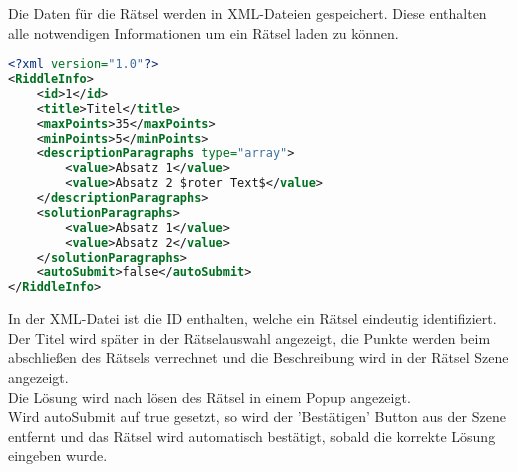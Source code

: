 Die Daten für die Rätsel werden in XML-Dateien gespeichert. Diese enthalten alle notwendigen Informationen um ein Rätsel laden zu können.
\begin{lstlisting}[language=xml, caption={Aufbau einer Rätsel XML-Datei}]
<?xml version="1.0"?>
<RiddleInfo>
    <id>1</id>
    <title>Titel</title>
    <maxPoints>35</maxPoints>
    <minPoints>5</minPoints>
    <descriptionParagraphs type="array">
        <value>Absatz 1</value>
        <value>Absatz 2 $roter Text$</value>
    </descriptionParagraphs>
    <solutionParagraphs>
        <value>Absatz 1</value>
        <value>Absatz 2</value>
    </solutionParagraphs>
    <autoSubmit>false</autoSubmit>
</RiddleInfo>
\end{lstlisting}
In der XML-Datei ist die ID enthalten, welche ein Rätsel eindeutig identifiziert. Der Titel wird später in der Rätselauswahl angezeigt, die Punkte werden beim abschließen des Rätsels verrechnet und die Beschreibung wird in der Rätsel Szene angezeigt. 
\\Die Lösung wird nach lösen des Rätsel in einem Popup angezeigt.
\\Wird autoSubmit auf true gesetzt, so wird der 'Bestätigen' Button aus der Szene entfernt und das Rätsel wird automatisch bestätigt, sobald die korrekte Lösung eingeben wurde.\\

